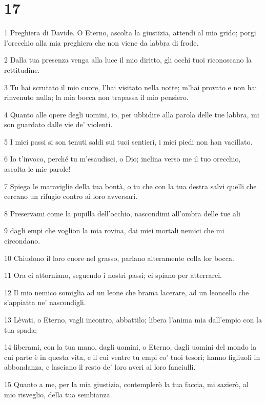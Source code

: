 \chapter{17}

\par 1 Preghiera di Davide. O Eterno, ascolta la giustizia, attendi al mio grido; porgi l'orecchio alla mia preghiera che non viene da labbra di frode.
\par 2 Dalla tua presenza venga alla luce il mio diritto, gli occhi tuoi riconoscano la rettitudine.
\par 3 Tu hai scrutato il mio cuore, l'hai visitato nella notte; m'hai provato e non hai rinvenuto nulla; la mia bocca non trapassa il mio pensiero.
\par 4 Quanto alle opere degli uomini, io, per ubbidire alla parola delle tue labbra, mi son guardato dalle vie de' violenti.
\par 5 I miei passi si son tenuti saldi sui tuoi sentieri, i miei piedi non han vacillato.
\par 6 Io t'invoco, perché tu m'esaudisci, o Dio; inclina verso me il tuo orecchio, ascolta le mie parole!
\par 7 Spiega le maraviglie della tua bontà, o tu che con la tua destra salvi quelli che cercano un rifugio contro ai loro avversari.
\par 8 Preservami come la pupilla dell'occhio, nascondimi all'ombra delle tue ali
\par 9 dagli empi che voglion la mia rovina, dai miei mortali nemici che mi circondano.
\par 10 Chiudono il loro cuore nel grasso, parlano alteramente colla lor bocca.
\par 11 Ora ci attorniano, seguendo i nostri passi; ci spiano per atterrarci.
\par 12 Il mio nemico somiglia ad un leone che brama lacerare, ad un leoncello che s'appiatta ne' nascondigli.
\par 13 Lèvati, o Eterno, vagli incontro, abbattilo; libera l'anima mia dall'empio con la tua spada;
\par 14 liberami, con la tua mano, dagli uomini, o Eterno, dagli uomini del mondo la cui parte è in questa vita, e il cui ventre tu empi co' tuoi tesori; hanno figliuoli in abbondanza, e lasciano il resto de' loro averi ai loro fanciulli.
\par 15 Quanto a me, per la mia giustizia, contemplerò la tua faccia, mi sazierò, al mio risveglio, della tua sembianza.

